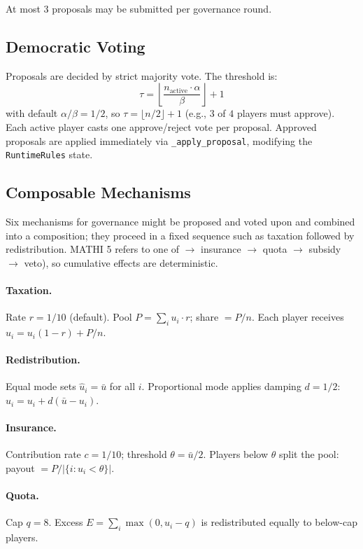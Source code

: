 At most $3$ proposals may be submitted per governance round.

\subsection{Democratic Voting}
\label{sec:voting}

Proposals are decided by strict majority vote. The threshold is:
\[
\tau = \left\lfloor \frac{n_{\text{active}} \cdot \alpha}{\beta} \right\rfloor + 1
\]
with default $\alpha/\beta = 1/2$, so $\tau = \lfloor n/2 \rfloor + 1$
(e.g., $3$ of $4$ players must approve). Each active player casts one
approve/reject vote per proposal. Approved proposals are applied immediately
via \texttt{\_apply\_proposal}, modifying the \texttt{RuntimeRules} state.

\subsection{Composable Mechanisms}
\label{sec:mechanisms}

Six mechanisms for governance might be proposed and voted upon and combined into a composition; they proceed in a fixed sequence such as taxation followed by redistribution. MATHI 5 refers to one of
$\to$ insurance $\to$ quota $\to$ subsidy $\to$ veto), so cumulative
effects are deterministic.

\paragraph{Taxation.} Rate $r = 1/10$ (default). Pool
$P = \sum_i u_i \cdot r$; share $= P / n$. Each player receives
$\hat{u}_i = u_i(1 - r) + P/n$.

\paragraph{Redistribution.} Equal mode sets $\hat{u}_i = \bar{u}$ for
all $i$. Proportional mode applies damping $d = 1/2$:
$\hat{u}_i = u_i + d(\bar{u} - u_i)$.

\paragraph{Insurance.} Contribution rate $c = 1/10$; threshold
$\theta = \bar{u}/2$. Players below $\theta$ split the pool:
payout $= P / |\{i : u_i < \theta\}|$.

\paragraph{Quota.} Cap $q = 8$. Excess $E = \sum_i \max(0, u_i - q)$
is redistributed equally to below-cap players.

